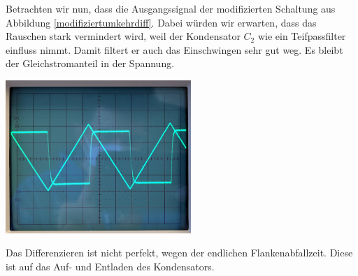 Betrachten wir nun, dass die Ausgangssignal der modifizierten Schaltung aus Abbildung \ref{modifiziertumkehrdiff}. Dabei würden wir erwarten, dass das Rauschen stark vermindert wird, weil der Kondensator $C_2$ wie ein Teifpassfilter einfluss nimmt. Damit filtert er auch das Einschwingen sehr gut weg. Es bleibt der Gleichstromanteil in der Spannung.
\begin{center}
    \includegraphics[width = 7cm]{Bilder/43-diffStabil.jpg}
    \label{Einschwingprozess}
\end{center}
Das Differenzieren ist nicht perfekt, wegen der endlichen Flankenabfallzeit. Diese ist auf das Auf- und Entladen des Kondensators.
\newpage


